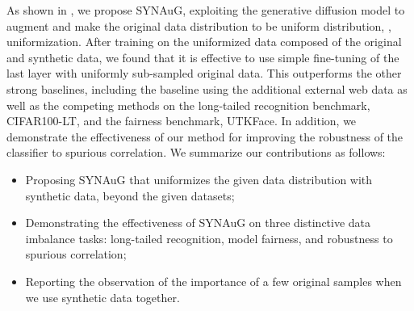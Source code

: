 As shown in , we propose SYNAuG, exploiting the generative diffusion model to augment and make the original data distribution to be uniform distribution, \ie, uniformization.
After training on the uniformized data composed of the original and synthetic data, we found that it is effective to use simple fine-tuning of the last layer with uniformly sub-sampled original data.
This outperforms the other strong baselines, including the baseline using the additional external web data as well as the competing methods on the long-tailed recognition benchmark, CIFAR100-LT, and the fairness benchmark, UTKFace.
In addition, we demonstrate the effectiveness of our method for improving the robustness of the classifier to spurious correlation.
We summarize our contributions as follows:
\begin{itemize}
    \item Proposing SYNAuG that uniformizes the given data distribution with synthetic data, beyond the given datasets;\vspace{-1mm}
    \item Demonstrating the effectiveness of SYNAuG on three distinctive data imbalance tasks: long-tailed recognition, model fairness, and robustness to spurious correlation;
    \vspace{-1mm}
    \item Reporting the observation of the importance of a few original samples when we use synthetic data together.
\end{itemize}



